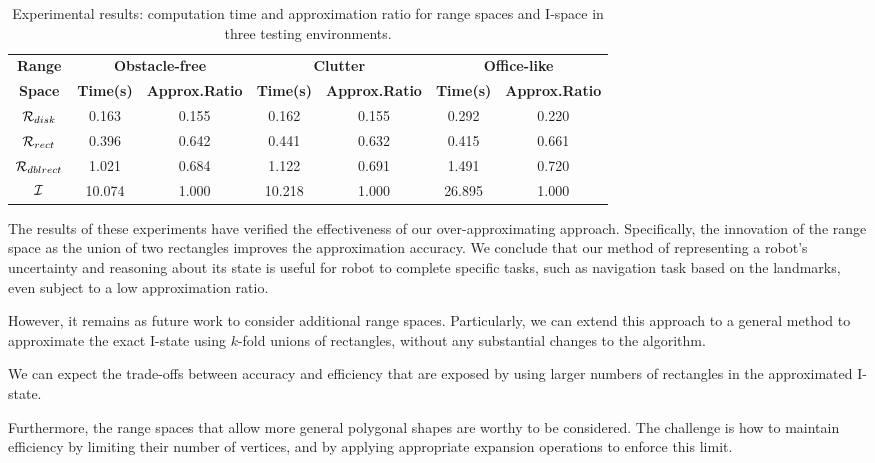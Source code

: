 \begin{table}
  \small\centering
  \caption{Experimental results: computation time and approximation
      ratio for range spaces and I-space in three testing environments.}
    \begin{tabular}{ccccccc} 
    \toprule 
    \textbf{Range}  & \multicolumn{2}{c}{\textbf{Obstacle-free}} & \multicolumn{2}{c}{\textbf{Clutter}} & \multicolumn{2}{c}{\textbf{Office-like}}\\
    \textbf{Space} & \textbf{Time(s)} & \textbf{Approx.Ratio} & \textbf{Time(s)} & \textbf{Approx.Ratio} & \textbf{Time(s)} & \textbf{Approx.Ratio} \\
    \midrule
    $\mathcal{R}_{disk}$ & 0.163 & 0.155 & 0.162 & 0.155  & 0.292 & 0.220 \\ 
    \midrule
    $\mathcal{R}_{rect}$ & 0.396 & 0.642  & 0.441 & 0.632 & 0.415 & 0.661 \\
    \midrule
    $\mathcal{R}_{dblrect}$ & 1.021 & 0.684 & 1.122 & 0.691 & 1.491 & 0.720 \\
    \midrule
    $\mathcal{I}$ & 10.074 & 1.000 & 10.218 & 1.000 & 26.895 & 1.000 \\
    \bottomrule     
    \end{tabular}
    \label{tab:exp-data}
\end{table}


The results of these experiments have verified the effectiveness of our over-approximating approach.
%
Specifically, the innovation of the range space as the union of
two rectangles improves the approximation accuracy. 
%
We conclude that our method of representing a robot's uncertainty and reasoning about its state is useful 
for robot to complete specific tasks, such as navigation task based on the landmarks, even subject to a low approximation ratio.

However, it remains as future work to consider additional range spaces.  
%
Particularly, we can extend this approach to a general method to approximate the exact I-state using $k$-fold unions of rectangles, 
without any substantial changes to the algorithm.  

We can expect the trade-offs between accuracy and efficiency that are exposed by using
larger numbers of rectangles in the approximated I-state.  

Furthermore, the range spaces that allow more general polygonal shapes are worthy to be considered. 
The challenge is how to maintain efficiency by limiting their number of vertices, 
and by applying appropriate expansion operations to enforce this limit.



